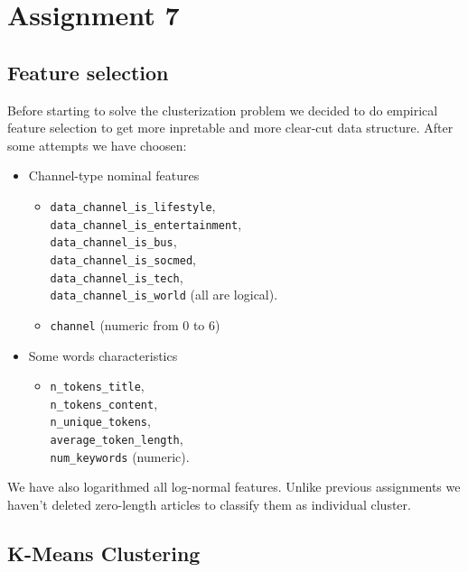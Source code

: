 \section{Assignment 7}
\subsection{Feature selection}

Before starting to solve the clusterization problem we decided to do empirical feature selection to get more inpretable and more clear-cut data structure. 
After some attempts we have choosen:
\begin{itemize}
\item
Channel-type nominal features

\begin{itemize}
\item
\texttt{data\_channel\_is\_lifestyle}, \\
\texttt{data\_channel\_is\_entertainment}, \\ 
\texttt{data\_channel\_is\_bus}, \\ 
\texttt{data\_channel\_is\_socmed}, \\
\texttt{data\_channel\_is\_tech}, \\
\texttt{data\_channel\_is\_world} (all are logical).

\item
\texttt{channel} (numeric from 0 to 6)
\end{itemize}
\item
Some words characteristics

\begin{itemize}
\item
\texttt{n\_tokens\_title}, \\
\texttt{n\_tokens\_content}, \\
\texttt{n\_unique\_tokens}, \\
\texttt{average\_token\_length}, \\
\texttt{num\_keywords} (numeric).
\end{itemize}
\end{itemize}

We have also logarithmed all log-normal features.
Unlike previous assignments we haven't deleted zero-length articles to classify them as individual cluster.

\subsection{K-Means Clustering}

